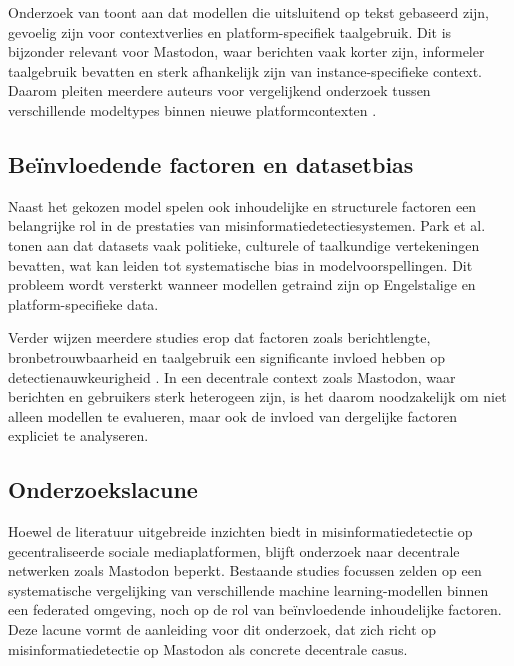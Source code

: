 Onderzoek van \textcite{Ruchansky2017} toont aan dat modellen
die uitsluitend op tekst gebaseerd zijn,
gevoelig zijn voor contextverlies en platform-specifiek taalgebruik.
Dit is bijzonder relevant voor Mastodon,
waar berichten vaak korter zijn, informeler taalgebruik bevatten
en sterk afhankelijk zijn van instance-specifieke context.
Daarom pleiten meerdere auteurs voor vergelijkend onderzoek
tussen verschillende modeltypes binnen nieuwe platformcontexten \autocite{Shu2017}.

\subsection{Beïnvloedende factoren en datasetbias}
\label{sec:bias_factoren}

Naast het gekozen model spelen ook inhoudelijke en structurele factoren
een belangrijke rol in de prestaties van misinformatiedetectiesystemen.
Park et al.\ \autocite{Park2022} tonen aan dat datasets
vaak politieke, culturele of taalkundige vertekeningen bevatten,
wat kan leiden tot systematische bias in modelvoorspellingen.
Dit probleem wordt versterkt wanneer modellen getraind zijn
op Engelstalige en platform-specifieke data.

Verder wijzen meerdere studies erop dat factoren zoals berichtlengte,
bronbetrouwbaarheid en taalgebruik
een significante invloed hebben op detectienauwkeurigheid \autocite{Shu2017,Ruchansky2017}.
In een decentrale context zoals Mastodon,
waar berichten en gebruikers sterk heterogeen zijn,
is het daarom noodzakelijk om niet alleen modellen te evalueren,
maar ook de invloed van dergelijke factoren expliciet te analyseren.

\subsection{Onderzoekslacune}
\label{sec:lacune}

Hoewel de literatuur uitgebreide inzichten biedt
in misinformatiedetectie op gecentraliseerde sociale mediaplatformen,
blijft onderzoek naar decentrale netwerken zoals Mastodon beperkt.
Bestaande studies focussen zelden op een systematische vergelijking
van verschillende machine learning-modellen
binnen een federated omgeving,
noch op de rol van beïnvloedende inhoudelijke factoren.
Deze lacune vormt de aanleiding voor dit onderzoek,
dat zich richt op misinformatiedetectie op Mastodon
als concrete decentrale casus.


